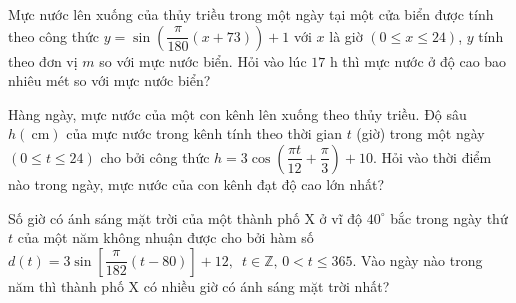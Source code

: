 \begin{ex}%
	Mực nước lên xuống của  thủy triều trong một ngày tại một cửa biển được tính theo công thức $y=\sin \left(\dfrac{\pi}{180}(x+73) \right)+1$ với $x$ là giờ $(0\leq x \leq 24)$, $y$ tính theo đơn vị $m$ so với mực nước biển.
	Hỏi vào lúc $17$  h thì mực nước ở độ cao bao nhiêu mét so với mực nước biển?
\end{ex}

\begin{ex}%
	Hàng ngày, mực nước của một con kênh lên xuống theo thủy triều. Độ sâu $h(\mathrm{~cm})$ của mực nước trong kênh tính theo thời gian $t$ (giờ) trong một ngày $(0\leq t \leq 24)$ cho bởi công  thức $h=3\cos \left(\dfrac{\pi t}{12}+\dfrac{\pi}{3}\right)+10$. Hỏi vào thời điểm nào trong ngày, mực nước của con kênh đạt độ cao lớn nhất?
\end{ex}

\begin{ex}%
	Số giờ có ánh sáng mặt trời của một thành phố X ở vĩ độ $40^\circ $ bắc trong ngày thứ $t$ của một năm không nhuận được cho bởi hàm số $d(t)=3\sin\left[\dfrac{\pi}{182}\left(t-80\right)\right]+12,$ $\,t\in\mathbb{Z}\text{,}$ $0<t\leq 365$. Vào ngày nào trong năm thì thành phố X có nhiều giờ có ánh sáng mặt trời nhất? 
\end{ex}

